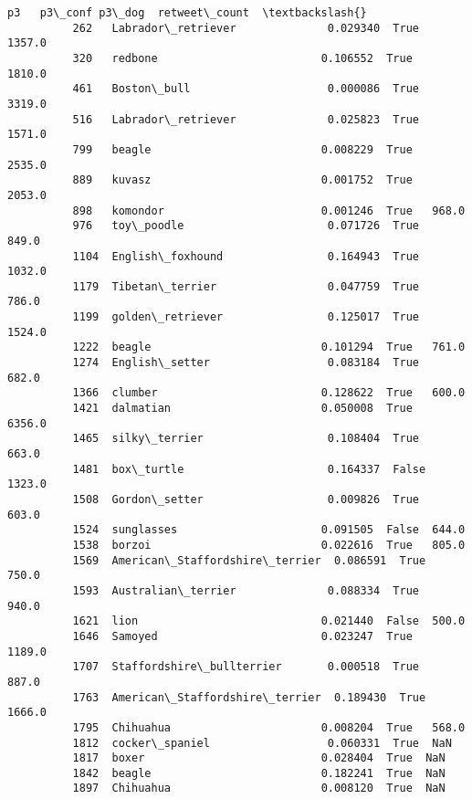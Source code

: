 \documentclass[11pt]{article}
\begin{document}
\begin{Verbatim}[commandchars=\\\{\}]
                                            p3   p3\_conf p3\_dog  retweet\_count  \textbackslash{}
          262   Labrador\_retriever              0.029340  True   1357.0          
          320   redbone                         0.106552  True   1810.0          
          461   Boston\_bull                     0.000086  True   3319.0          
          516   Labrador\_retriever              0.025823  True   1571.0          
          799   beagle                          0.008229  True   2535.0          
          889   kuvasz                          0.001752  True   2053.0          
          898   komondor                        0.001246  True   968.0           
          976   toy\_poodle                      0.071726  True   849.0           
          1104  English\_foxhound                0.164943  True   1032.0          
          1179  Tibetan\_terrier                 0.047759  True   786.0           
          1199  golden\_retriever                0.125017  True   1524.0          
          1222  beagle                          0.101294  True   761.0           
          1274  English\_setter                  0.083184  True   682.0           
          1366  clumber                         0.128622  True   600.0           
          1421  dalmatian                       0.050008  True   6356.0          
          1465  silky\_terrier                   0.108404  True   663.0           
          1481  box\_turtle                      0.164337  False  1323.0          
          1508  Gordon\_setter                   0.009826  True   603.0           
          1524  sunglasses                      0.091505  False  644.0           
          1538  borzoi                          0.022616  True   805.0           
          1569  American\_Staffordshire\_terrier  0.086591  True   750.0           
          1593  Australian\_terrier              0.088334  True   940.0           
          1621  lion                            0.021440  False  500.0           
          1646  Samoyed                         0.023247  True   1189.0          
          1707  Staffordshire\_bullterrier       0.000518  True   887.0           
          1763  American\_Staffordshire\_terrier  0.189430  True   1666.0          
          1795  Chihuahua                       0.008204  True   568.0           
          1812  cocker\_spaniel                  0.060331  True  NaN              
          1817  boxer                           0.028404  True  NaN              
          1842  beagle                          0.182241  True  NaN              
          1897  Chihuahua                       0.008120  True  NaN              

\end{Verbatim}
\end{document}
